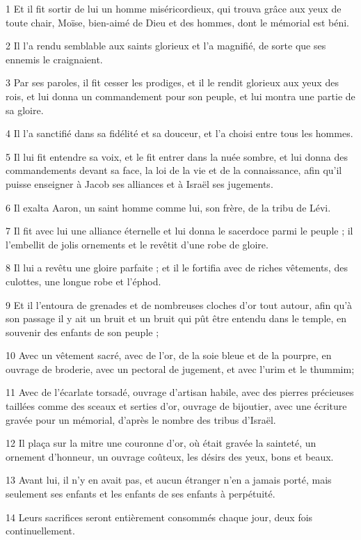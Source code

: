 \par 1 Et il fit sortir de lui un homme miséricordieux, qui trouva grâce aux yeux de toute chair, Moïse, bien-aimé de Dieu et des hommes, dont le mémorial est béni.
\par 2 Il l'a rendu semblable aux saints glorieux et l'a magnifié, de sorte que ses ennemis le craignaient.
\par 3 Par ses paroles, il fit cesser les prodiges, et il le rendit glorieux aux yeux des rois, et lui donna un commandement pour son peuple, et lui montra une partie de sa gloire.
\par 4 Il l'a sanctifié dans sa fidélité et sa douceur, et l'a choisi entre tous les hommes.
\par 5 Il lui fit entendre sa voix, et le fit entrer dans la nuée sombre, et lui donna des commandements devant sa face, la loi de la vie et de la connaissance, afin qu'il puisse enseigner à Jacob ses alliances et à Israël ses jugements.
\par 6 Il exalta Aaron, un saint homme comme lui, son frère, de la tribu de Lévi.
\par 7 Il fit avec lui une alliance éternelle et lui donna le sacerdoce parmi le peuple ; il l'embellit de jolis ornements et le revêtit d'une robe de gloire.
\par 8 Il lui a revêtu une gloire parfaite ; et il le fortifia avec de riches vêtements, des culottes, une longue robe et l'éphod.
\par 9 Et il l'entoura de grenades et de nombreuses cloches d'or tout autour, afin qu'à son passage il y ait un bruit et un bruit qui pût être entendu dans le temple, en souvenir des enfants de son peuple ;
\par 10 Avec un vêtement sacré, avec de l'or, de la soie bleue et de la pourpre, en ouvrage de broderie, avec un pectoral de jugement, et avec l'urim et le thummim;
\par 11 Avec de l'écarlate torsadé, ouvrage d'artisan habile, avec des pierres précieuses taillées comme des sceaux et serties d'or, ouvrage de bijoutier, avec une écriture gravée pour un mémorial, d'après le nombre des tribus d'Israël.
\par 12 Il plaça sur la mitre une couronne d'or, où était gravée la sainteté, un ornement d'honneur, un ouvrage coûteux, les désirs des yeux, bons et beaux.
\par 13 Avant lui, il n'y en avait pas, et aucun étranger n'en a jamais porté, mais seulement ses enfants et les enfants de ses enfants à perpétuité.
\par 14 Leurs sacrifices seront entièrement consommés chaque jour, deux fois continuellement.
